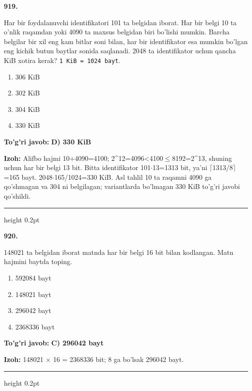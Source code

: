 \documentclass[10pt,a4paper,oneside]{article}
\begin{document}
\noindent\textbf{\color{ink}919.}
\par
Har bir foydalanuvchi identifikatori 101 ta belgidan iborat. Har bir belgi 10 ta o'nlik raqamdan yoki 4090 ta maxsus belgidan biri bo'lishi mumkin. Barcha belgilar bir xil eng kam bitlar soni bilan, har bir identifikator esa mumkin bo'lgan eng kichik butun baytlar sonida saqlanadi. 2048 ta identifikator uchun qancha KiB xotira kerak? \texttt{1 KiB = 1024 bayt}.
\begin{enumerate}[label=\Alph*),leftmargin=9mm]
\item 306 KiB
\item 302 KiB
\item 304 KiB
\item 330 KiB
\end{enumerate}
\begin{tcolorbox}[enhanced,breakable,colback=teal!4,colframe=teal!50!black,boxrule=0.5pt,arc=1.1mm,left=3mm,right=3mm,top=1.7mm,bottom=1.7mm,before skip=2mm,after skip=2mm]
\textbf{\color{teal}To'g'ri javob:} \textbf{D) 330 KiB}
\par\smallskip
\textbf{Izoh:} Alifbo hajmi 10+4090=4100; 2\textasciicircum{}12=4096\textless{}4100\ensuremath{\leq}8192=2\textasciicircum{}13, shuning uchun har bir belgi 13 bit. Bitta identifikator 101\ensuremath{\cdot}13=1313 bit, ya'ni \ensuremath{\lceil}1313/8\ensuremath{\rceil}=165 bayt. 2048\ensuremath{\cdot}165/1024=330 KiB. Asl tahlil 10 ta raqamni 4090 ga qo'shmagan va 304 ni belgilagan; variantlarda bo'lmagan 330 KiB to'g'ri javobi qo'shildi.
\end{tcolorbox}
\vspace{2mm}\hrule height 0.2pt \vspace{3mm}

\noindent\textbf{\color{ink}920.}
\par
148021 ta belgidan iborat matnda har bir belgi 16 bit bilan kodlangan. Matn hajmini baytda toping.
\begin{enumerate}[label=\Alph*),leftmargin=9mm]
\item 592084 bayt
\item 148021 bayt
\item 296042 bayt
\item 2368336 bayt
\end{enumerate}
\begin{tcolorbox}[enhanced,breakable,colback=teal!4,colframe=teal!50!black,boxrule=0.5pt,arc=1.1mm,left=3mm,right=3mm,top=1.7mm,bottom=1.7mm,before skip=2mm,after skip=2mm]
\textbf{\color{teal}To'g'ri javob:} \textbf{C) 296042 bayt}
\par\smallskip
\textbf{Izoh:} 148021 \ensuremath{\times} 16 = 2368336 bit; 8 ga bo'lsak 296042 bayt.
\end{tcolorbox}
\vspace{2mm}\hrule height 0.2pt \vspace{3mm}
\end{document}

